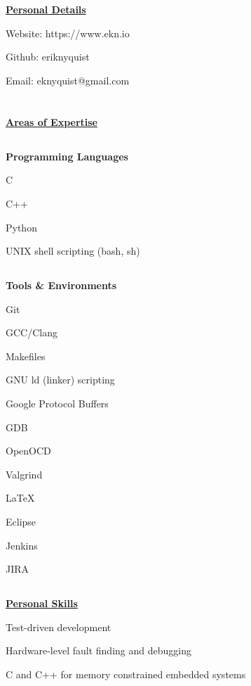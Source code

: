 \documentclass[6pt]{article}
\begin{document}
%
%
\hspace*{-\parindent}%
\begin{minipage}{15em}
\section*{}
{\underline{\textbf{Personal Details}}}
\break

{\small Website: https://www.ekn.io

Github: eriknyquist

Email: eknyquist@gmail.com}

\section*{}
{\underline{\textbf{Areas of Expertise}}}
\subsection*{}
{\textbf{Programming Languages}}

{\small C

C++

Python

UNIX shell scripting (bash, sh)}

\subsection*{}
{\textbf{Tools \& Environments}}

{\small Git

GCC/Clang

Makefiles

GNU ld (linker) scripting

Google Protocol Buffers

GDB

OpenOCD

Valgrind

LaTeX

Eclipse

Jenkins

JIRA}

\subsection*{}
{\underline{\textbf{Personal Skills}}}

\noindent
\begin{itemize}
{\small \raggedright
    \item Test-driven development
    \item Hardware-level fault finding and debugging
    \item C and C++ for memory constrained embedded systems
}
\end{itemize}


\end{minipage}
\end{document}
